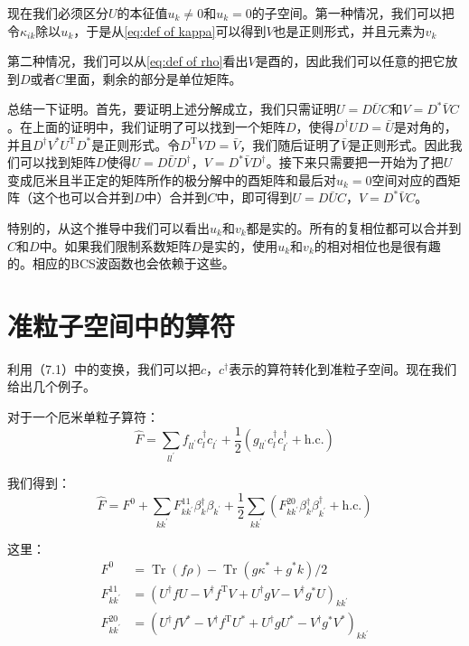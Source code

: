 现在我们必须区分$U$的本征值$u_{k}\neq0$和$u_{k}=0$的子空间。第一种情况，我们可以把令$\kappa_{ik}$除以$u_{k}$，于是从\ref{eq:def of kappa}可以得到$V$也是正则形式，并且元素为$v_{k}$

第二种情况，我们可以从\ref{eq:def of rho}看出$V$是酉的，因此我们可以任意的把它放到$D$或者$C$里面，剩余的部分是单位矩阵。
\begin{booknote*}
总结一下证明。首先，要证明上述分解成立，我们只需证明$U=D\bar{U}C$和$V=D^{*}\bar{V}C$。在上面的证明中，我们证明了可以找到一个矩阵$D$，使得$D^{\dagger}UD=\bar{U}$是对角的，并且$D^{\dagger}V^{*}U^{\mathrm{T}}D^{*}$是正则形式。令$D^{\mathrm{T}}VD=\bar{V}$，我们随后证明了$\bar{V}$是正则形式。因此我们可以找到矩阵$D$使得$U=D\bar{U}D^{\dagger}$，$V=D^{*}\bar{V}D^{\dagger}$。接下来只需要把一开始为了把$U$变成厄米且半正定的矩阵所作的极分解中的酉矩阵和最后对$u_{k}=0$空间对应的酉矩阵（这个也可以合并到$D$中）合并到$C$中，即可得到$U=D\bar{U}C$，$V=D^{*}\bar{V}C$。
\end{booknote*}
特别的，从这个推导中我们可以看出$u_{k}$和$v_{k}$都是实的。所有的复相位都可以合并到$C$和$D$中。如果我们限制系数矩阵$D$是实的，使用$u_{k}$和$v_{k}$的相对相位也是很有趣的。相应的BCS波函数也会依赖于这些。

\section{准粒子空间中的算符}

利用（7.1）中的变换，我们可以把$c$，$c^{\dagger}$表示的算符转化到准粒子空间。现在我们给出几个例子。

对于一个厄米单粒子算符：
\[
\hat{F}=\sum_{ll^{\prime}}f_{ll^{\prime}}c^{\dagger}_{l}c_{l^{\prime}}+\frac{1}{2}(g_{ll^{\prime}}c^{\dagger}_{l}c^{\dagger}_{l^{\prime}}+\text{h.c.})
\]

我们得到：
\[
\hat{F}=F^{0}+\sum_{kk^{\prime}}F^{11}_{kk^{\prime}}\beta^{\dagger}_{k}\beta_{k^{\prime}}+\frac{1}{2}\sum_{kk^{\prime}}(F^{20}_{kk^{\prime}}\beta^{\dagger}_{k}\beta^{\dagger}_{k^{\prime}}+\text{h.c.})
\]

这里：
\begin{align*}
F^{0} & =\mathop{\text{Tr}}(f\rho)-\mathop{\text{Tr}}(g\kappa^{*}+g^{*}k)/2\\
F^{11}_{kk^{\prime}} & =(U^{\dagger}fU-V^{\dagger}f^{\mathrm{T}}V+U^{\dagger}gV-V^{\dagger}g^{*}U)_{kk^{\prime}}\\
F^{20}_{kk^{\prime}} & =(U^{\dagger}fV^{*}-V^{\dagger}f^{\mathrm{T}}U^{*}+U^{\dagger}gU^{*}-V^{\dagger}g^{*}V^{*})_{kk^{\prime}}
\end{align*}


